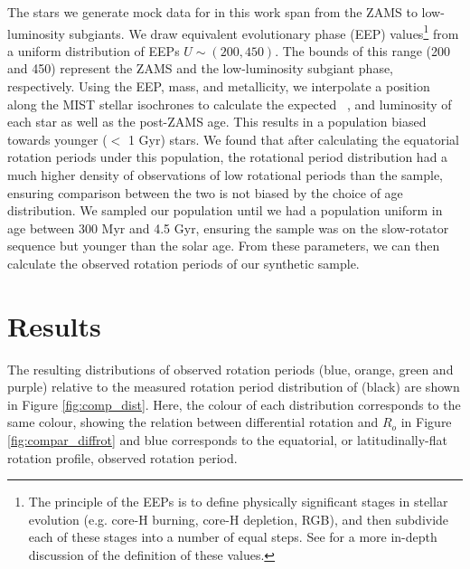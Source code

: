 The stars we generate mock data for in this work span from the ZAMS to low-luminosity subgiants.
We draw equivalent evolutionary phase (EEP) values\footnote{The principle of the EEPs is to define physically significant stages in stellar evolution (e.g. core-H burning, core-H depletion, RGB), and then subdivide each of these stages into a number of equal steps. See \citet{morton_isochrones_2015} for a more in-depth discussion of the definition of these values.} from a uniform distribution of EEPs $U\sim(200,450)$.
The bounds of this range (200 and 450) represent the ZAMS and the low-luminosity subgiant phase, respectively.
Using the EEP, mass, and metallicity, we interpolate a position along the MIST stellar isochrones \citep{morton_isochrones_2015} to calculate the expected \teff \ , and luminosity of each star as well as the post-ZAMS age.
This results in a population biased towards younger ($<$ 1 Gyr) stars.
We found that after calculating the equatorial rotation periods under this population, the rotational period distribution had a much higher density of observations of low rotational periods than the \citet{mcquillan_rotation_2014} sample, ensuring comparison between the two is not biased by the choice of age distribution.
We sampled our population until we had a population uniform in age between 300 Myr and 4.5 Gyr, ensuring the sample was on the slow-rotator sequence but younger than the solar age.
From these parameters, we can then calculate the observed rotation periods of our synthetic sample.

\section{Results}
\label{sec:results}

The resulting distributions of observed rotation periods (blue, orange, green and purple) relative to the measured rotation period distribution of \kepler{} \citep{mcquillan_rotation_2014} (black) are shown in Figure \ref{fig:comp_dist}.
Here, the colour of each distribution corresponds to the same colour, showing the relation between differential rotation and $R_o$ in Figure \ref{fig:compar_diffrot} and blue corresponds to the equatorial, or latitudinally-flat rotation profile, observed rotation period.

